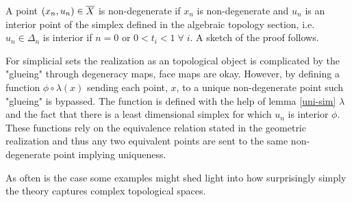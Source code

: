 \documentclass[../../main.tex]{subfiles}
\begin{document}
    A point $(x_n,u_n)\in \overline X$ is non-degenerate if $x_n$ is non-degenerate and $u_n$ is an interior point of the simplex defined in the algebraic topology section, i.e. $u_n\in \Delta_n$ is interior if $ n=0$ or $ 0< t_i < 1 \;\forall\; i$. A sketch of the proof follows.  

    For simplicial sets the realization as an topological object is complicated by the "glueing" through degeneracy maps, face maps are okay. However, by defining a function $\phi\circ\lambda (x)$ sending each point, $x$, to a unique non-degenerate point such "glueing" is bypassed. The function is defined with the help of lemma \ref{uni-sim} $\lambda$ and the fact that there is a least dimensional simplex for which $u_n$ is interior $\phi$. These functions rely on the equivalence relation stated in the geometric realization and thus any two equivalent points are sent to the same non-degenerate point implying uniqueness. 

    As often is the case some examples might shed light into how surprisingly simply the theory captures complex topological spaces.

\end{document}
